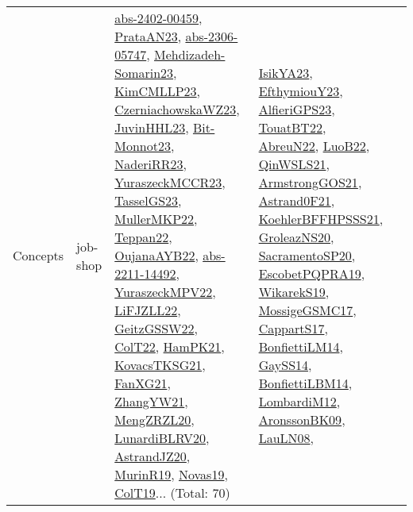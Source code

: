 {\begin{longtable}{lp{3cm}>{\raggedright}p{6cm}>{\raggedright}p{6cm}p{8cm}}
Concepts & job-shop & \href{articles/abs-2402-00459.pdf}{abs-2402-00459}\cite{abs-2402-00459}, \href{articles/PrataAN23.pdf}{PrataAN23}\cite{PrataAN23}, \href{articles/abs-2306-05747.pdf}{abs-2306-05747}\cite{abs-2306-05747}, \href{papers/Mehdizadeh-Somarin23.pdf}{Mehdizadeh-Somarin23}\cite{Mehdizadeh-Somarin23}, \href{papers/KimCMLLP23.pdf}{KimCMLLP23}\cite{KimCMLLP23}, \href{articles/CzerniachowskaWZ23.pdf}{CzerniachowskaWZ23}\cite{CzerniachowskaWZ23}, \href{papers/JuvinHHL23.pdf}{JuvinHHL23}\cite{JuvinHHL23}, \href{papers/Bit-Monnot23.pdf}{Bit-Monnot23}\cite{Bit-Monnot23}, \href{articles/NaderiRR23.pdf}{NaderiRR23}\cite{NaderiRR23}, \href{articles/YuraszeckMCCR23.pdf}{YuraszeckMCCR23}\cite{YuraszeckMCCR23}, \href{papers/TasselGS23.pdf}{TasselGS23}\cite{TasselGS23}, \href{articles/MullerMKP22.pdf}{MullerMKP22}\cite{MullerMKP22}, \href{papers/Teppan22.pdf}{Teppan22}\cite{Teppan22}, \href{papers/OujanaAYB22.pdf}{OujanaAYB22}\cite{OujanaAYB22}, \href{articles/abs-2211-14492.pdf}{abs-2211-14492}\cite{abs-2211-14492}, \href{articles/YuraszeckMPV22.pdf}{YuraszeckMPV22}\cite{YuraszeckMPV22}, \href{papers/LiFJZLL22.pdf}{LiFJZLL22}\cite{LiFJZLL22}, \href{papers/GeitzGSSW22.pdf}{GeitzGSSW22}\cite{GeitzGSSW22}, \href{articles/ColT22.pdf}{ColT22}\cite{ColT22}, \href{articles/HamPK21.pdf}{HamPK21}\cite{HamPK21}, \href{papers/KovacsTKSG21.pdf}{KovacsTKSG21}\cite{KovacsTKSG21}, \href{articles/FanXG21.pdf}{FanXG21}\cite{FanXG21}, \href{articles/ZhangYW21.pdf}{ZhangYW21}\cite{ZhangYW21}, \href{articles/MengZRZL20.pdf}{MengZRZL20}\cite{MengZRZL20}, \href{articles/LunardiBLRV20.pdf}{LunardiBLRV20}\cite{LunardiBLRV20}, \href{articles/AstrandJZ20.pdf}{AstrandJZ20}\cite{AstrandJZ20}, \href{papers/MurinR19.pdf}{MurinR19}\cite{MurinR19}, \href{articles/Novas19.pdf}{Novas19}\cite{Novas19}, \href{papers/ColT19.pdf}{ColT19}\cite{ColT19}... (Total: 70) & \href{articles/IsikYA23.pdf}{IsikYA23}\cite{IsikYA23}, \href{papers/EfthymiouY23.pdf}{EfthymiouY23}\cite{EfthymiouY23}, \href{articles/AlfieriGPS23.pdf}{AlfieriGPS23}\cite{AlfieriGPS23}, \href{papers/TouatBT22.pdf}{TouatBT22}\cite{TouatBT22}, \href{articles/AbreuN22.pdf}{AbreuN22}\cite{AbreuN22}, \href{papers/LuoB22.pdf}{LuoB22}\cite{LuoB22}, \href{articles/QinWSLS21.pdf}{QinWSLS21}\cite{QinWSLS21}, \href{papers/ArmstrongGOS21.pdf}{ArmstrongGOS21}\cite{ArmstrongGOS21}, \href{papers/Astrand0F21.pdf}{Astrand0F21}\cite{Astrand0F21}, \href{articles/KoehlerBFFHPSSS21.pdf}{KoehlerBFFHPSSS21}\cite{KoehlerBFFHPSSS21}, \href{papers/GroleazNS20.pdf}{GroleazNS20}\cite{GroleazNS20}, \href{articles/SacramentoSP20.pdf}{SacramentoSP20}\cite{SacramentoSP20}, \href{articles/EscobetPQPRA19.pdf}{EscobetPQPRA19}\cite{EscobetPQPRA19}, \href{articles/WikarekS19.pdf}{WikarekS19}\cite{WikarekS19}, \href{papers/MossigeGSMC17.pdf}{MossigeGSMC17}\cite{MossigeGSMC17}, \href{papers/CappartS17.pdf}{CappartS17}\cite{CappartS17}, \href{papers/BonfiettiLM14.pdf}{BonfiettiLM14}\cite{BonfiettiLM14}, \href{papers/GaySS14.pdf}{GaySS14}\cite{GaySS14}, \href{articles/BonfiettiLBM14.pdf}{BonfiettiLBM14}\cite{BonfiettiLBM14}, \href{articles/LombardiM12.pdf}{LombardiM12}\cite{LombardiM12}, \href{papers/AronssonBK09.pdf}{AronssonBK09}\cite{AronssonBK09}, \href{papers/LauLN08.pdf}{LauLN08}\cite{LauLN08}, 
\end{longtable}}
